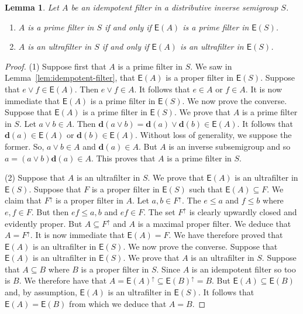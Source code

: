 \documentclass[a4paper]{amsart}
\newtheorem{lemma}[theorem]{Lemma}
\begin{document}
\begin{lemma}\label{lem:relating} Let $A$ be an idempotent filter in a distributive inverse semigroup $S$.
\begin{enumerate}
\item $A$ is a prime filter in $S$ if and only if $\mathsf{E}(A)$ is a prime filter in $\mathsf{E}(S)$. 
\item $A$ is an ultrafilter in $S$ if and only if $\mathsf{E}(A)$ is an ultrafilter in $\mathsf{E}(S)$. 
\end{enumerate}
\end{lemma}
\begin{proof} (1) Suppose first that $A$ is a prime filter in $S$.
We saw in Lemma~\ref{lem:idempotent-filter}, that $\mathsf{E}(A)$ is a proper filter in $\mathsf{E}(S)$.
Suppose that $e \vee f \in \mathsf{E}(A)$.
Then $e \vee f \in A$.
It follows that $e \in A$ or $f \in A$.
It is now immediate that $\mathsf{E}(A)$ is a prime filter in $\mathsf{E}(S)$.
We now prove the converse.
Suppose that  $\mathsf{E}(A)$ is a prime filter in $\mathsf{E}(S)$.
We prove that $A$ is a prime filter in $S$.
Let $a \vee b \in A$.
Then $\mathbf{d} (a \vee b) = \mathbf{d}(a) \vee \mathbf{d}(b) \in \mathsf{E}(A)$.
It follows that $\mathbf{d}(a) \in \mathsf{E}(A)$ or $\mathbf{d}(b) \in \mathsf{E}(A)$.
Without loss of generality, we suppose the former.
So, $a \vee b \in A$ and $\mathbf{d}(a) \in A$.
But $A$ is an inverse subsemigroup and so $a = (a \vee b)\mathbf{d}(a) \in A$.
This proves that $A$ is a prime filter in $S$.

(2) Suppose that $A$ is an ultrafilter in $S$.
We prove that $\mathsf{E}(A)$ is an ultrafilter in $\mathsf{E}(S)$.
Suppose that $F$ is a proper filter in  $\mathsf{E}(S)$ such that $\mathsf{E}(A) \subseteq F$.
We claim that $F^{\uparrow}$ is a proper filter in $A$.
Let $a, b \in F^{\uparrow}$.
The  $e \leq a$ and $f \leq b$ where $e,f \in F$.
But then $ef \leq a,b$ and $ef \in F$.
The set $F^{\uparrow}$ is clearly upwardly closed and evidently proper.
But $A \subseteq F^{\uparrow}$ and $A$ is a maximal proper filter.
We deduce that $A = F^{\uparrow}$.
It is now immediate that $\mathsf{E}(A) = F$.
We have therefore proved that $\mathsf{E}(A)$ is an ultrafilter in $\mathsf{E}(S)$.
We now prove the converse.
Suppose that $\mathsf{E}(A)$ is an ultrafilter in $\mathsf{E}(S)$.
We prove that $A$ is an ultrafilter in $S$.
Suppose that $A \subseteq B$ where $B$ is a proper filter in $S$.
Since $A$ is an idempotent filter so too is $B$.
We therefore have that $A = \mathsf{E}(A)^{\uparrow} \subseteq \mathsf{E}(B)^{\uparrow} = B$.
But $\mathsf{E}(A) \subseteq \mathsf{E}(B)$ and, by assumption, $\mathsf{E}(A)$ is an ultrafilter in $\mathsf{E}(S)$.
It follows that $\mathsf{E}(A) = \mathsf{E}(B)$ from which we deduce that $A = B$. 
\end{proof}
\end{document}

